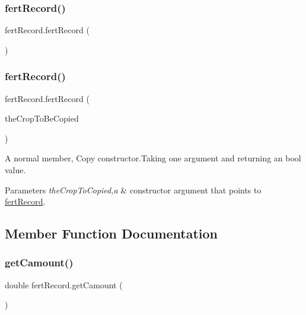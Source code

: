 \subsubsection{\texorpdfstring{fertRecord()}{fertRecord()}\hspace{0.1cm}{\footnotesize\ttfamily [1/2]}}
{\footnotesize\ttfamily fert\+Record.\+fert\+Record (\begin{DoxyParamCaption}{ }\end{DoxyParamCaption})\hspace{0.3cm}{\ttfamily [inline]}}

\mbox{\label{classfert_record_aec62ffe21df97c2b28e3c0c37a113d33}} 
\subsubsection{\texorpdfstring{fertRecord()}{fertRecord()}\hspace{0.1cm}{\footnotesize\ttfamily [2/2]}}
{\footnotesize\ttfamily fert\+Record.\+fert\+Record (\begin{DoxyParamCaption}\item[{\mbox{\hyperlink{classfert_record}{fert\+Record}}}]{the\+Crop\+To\+Be\+Copied }\end{DoxyParamCaption})\hspace{0.3cm}{\ttfamily [inline]}}



A normal member, Copy constructor.\+Taking one argument and returning an bool value. 


\begin{DoxyParams}{Parameters}
{\em the\+Crop\+To\+Copied,a} & constructor argument that points to \mbox{\hyperlink{classfert_record}{fert\+Record}}. \\
\hline
\end{DoxyParams}


\subsection{Member Function Documentation}
\mbox{\label{classfert_record_a21f44353a6a878ec133439ecd292ced0}} 
\subsubsection{\texorpdfstring{getCamount()}{getCamount()}}
{\footnotesize\ttfamily double fert\+Record.\+get\+Camount (\begin{DoxyParamCaption}{ }\end{DoxyParamCaption})\hspace{0.3cm}{\ttfamily [inline]}}



